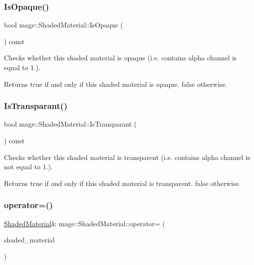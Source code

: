 \subsubsection{\texorpdfstring{Is\+Opaque()}{IsOpaque()}}
{\footnotesize\ttfamily bool mage\+::\+Shaded\+Material\+::\+Is\+Opaque (\begin{DoxyParamCaption}{ }\end{DoxyParamCaption}) const\hspace{0.3cm}{\ttfamily [noexcept]}}

Checks whether this shaded material is opaque (i.\+e. contains alpha channel is equal to 1.).

\begin{DoxyReturn}{Returns}
{\ttfamily true} if and only if this shaded material is opaque. {\ttfamily false} otherwise. 
\end{DoxyReturn}
\hypertarget{structmage_1_1_shaded_material_a2c45665faa666d3e85f51b13223e3699}{}\label{structmage_1_1_shaded_material_a2c45665faa666d3e85f51b13223e3699} 
\subsubsection{\texorpdfstring{Is\+Transparant()}{IsTransparant()}}
{\footnotesize\ttfamily bool mage\+::\+Shaded\+Material\+::\+Is\+Transparant (\begin{DoxyParamCaption}{ }\end{DoxyParamCaption}) const\hspace{0.3cm}{\ttfamily [noexcept]}}

Checks whether this shaded material is transparent (i.\+e. contains alpha channel is not equal to 1.).

\begin{DoxyReturn}{Returns}
{\ttfamily true} if and only if this shaded material is transparent. {\ttfamily false} otherwise. 
\end{DoxyReturn}
\hypertarget{structmage_1_1_shaded_material_ade9ec3ee6aae198e695240a5b89a0d72}{}\label{structmage_1_1_shaded_material_ade9ec3ee6aae198e695240a5b89a0d72} 
\subsubsection{\texorpdfstring{operator=()}{operator=()}\hspace{0.1cm}{\footnotesize\ttfamily [1/2]}}
{\footnotesize\ttfamily \hyperlink{structmage_1_1_shaded_material}{Shaded\+Material}\& mage\+::\+Shaded\+Material\+::operator= (\begin{DoxyParamCaption}\item[{const \hyperlink{structmage_1_1_shaded_material}{Shaded\+Material} \&}]{shaded\+\_\+material }\end{DoxyParamCaption})\hspace{0.3cm}{\ttfamily [default]}}

